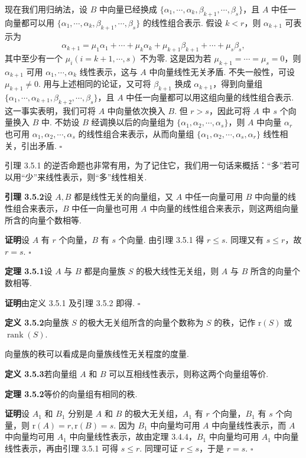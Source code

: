 \documentclass[UTF8, 12pt, fontset=fandol, oneside]{ctexart}
\begin{document}
现在我们用归纳法，设 $B$ 中向量已经换成 $\{\alpha_1,\cdots,\alpha_k,\beta_{k+1},\cdots,\beta_s\}$，且 $A$ 中任一向量都可以用 $\{\alpha_1,\cdots,\alpha_k,\beta_{k+1},\cdots,\beta_s\}$ 的线性组合表示. 假设 $k<r$，则 $\alpha_{k+1}$ 可表示为
\[
\alpha_{k+1}=\mu_1\alpha_1+\cdots+\mu_k\alpha_k+\mu_{k+1}\beta_{k+1}+\cdots+\mu_s\beta_s,
\]
其中至少有一个 $\mu_i(i=k+1,\cdots,s)$ 不为零. 这是因为若 $\mu_{k+1}=\cdots=\mu_s=0$，则 $\alpha_{k+1}$ 可用 $\alpha_1,\cdots,\alpha_k$ 线性表示，这与 $A$ 中向量线性无关矛盾. 不失一般性，可设 $\mu_{k+1}\neq 0$. 用与上述相同的论证，又可将 $\beta_{k+1}$ 换成 $\alpha_{k+1}$，得到向量组 $\{\alpha_1,\cdots,\alpha_{k+1},\beta_{k+2},\cdots,\beta_s\}$，且 $A$ 中任一向量都可以用这组向量的线性组合表示. 这一事实表明，我们可将 $A$ 中向量依次换入 $B$. 但 $r>s$，因此可将 $A$ 中 $s$ 个向量换入 $B$ 中. 不妨设 $B$ 经调换以后的向量组为 $\{\alpha_1,\alpha_2,\cdots,\alpha_s\}$，则 $A$ 中向量 $\alpha_r$ 也可用 $\alpha_1,\alpha_2,\cdots,\alpha_s$ 的线性组合来表示，从而向量组 $\{\alpha_1,\alpha_2,\cdots,\alpha_s,\alpha_r\}$ 线性相关，引出矛盾. $\square$

引理 3.5.1 的逆否命题也非常有用，为了记住它，我们用一句话来概括：“多”若可以用“少”来线性表示，则“多”线性相关.

\noindent\textbf{引理 3.5.2}\quad 设 $A,B$ 都是线性无关的向量组，又 $A$ 中任一向量可用 $B$ 中向量的线性组合来表示，$B$ 中任一向量也可用 $A$ 中向量的线性组合来表示，则这两组向量所含的向量个数相等.

\noindent\textbf{证明}\quad 设 $A$ 有 $r$ 个向量，$B$ 有 $s$ 个向量. 由引理 3.5.1 得 $r\leq s$. 同理又有 $s\leq r$，故 $r=s$. $\square$

\noindent\textbf{定理 3.5.1}\quad 设 $A$ 与 $B$ 都是向量族 $S$ 的极大线性无关组，则 $A$ 与 $B$ 所含的向量个数相等.

\noindent\textbf{证明}\quad 由定义 3.5.1 及引理 3.5.2 即得. $\square$

\noindent\textbf{定义 3.5.2}\quad 向量族 $S$ 的极大无关组所含的向量个数称为 $S$ 的秩，记作 $\mathrm{r}(S)$ 或 $\operatorname{rank}(S)$.

向量族的秩可以看成是向量族线性无关程度的度量.

\noindent\textbf{定义 3.5.3}\quad 若向量组 $A$ 和 $B$ 可以互相线性表示，则称这两个向量组等价.

\noindent\textbf{定理 3.5.2}\quad 等价的向量组有相同的秩.

\noindent\textbf{证明}\quad 设 $A_1$ 和 $B_1$ 分别是 $A$ 和 $B$ 的极大无关组，$A_1$ 有 $r$ 个向量，$B_1$ 有 $s$ 个向量，则 $\mathrm{r}(A)=r,\mathrm{r}(B)=s$. 因为 $B_1$ 中向量均可用 $A$ 中向量线性表示，而 $A$ 中向量均可用 $A_1$ 中向量线性表示，故由定理 3.4.4，$B_1$ 中向量均可用 $A_1$ 中向量线性表示，再由引理 3.5.1 可得 $s\leq r$. 同理可证 $r\leq s$，于是 $r=s$. $\square$
\end{document}
